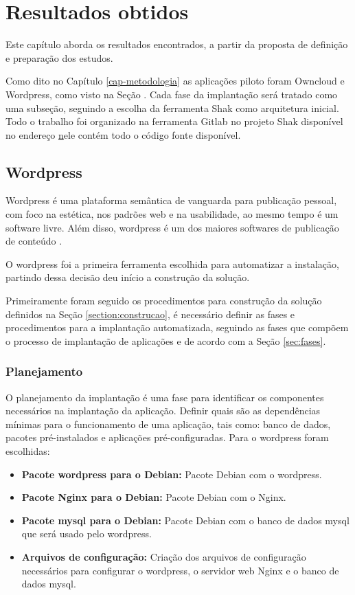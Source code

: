 \chapter{Resultados obtidos}
\label{cap-resultados}

Este capítulo aborda os resultados encontrados, a partir da proposta de
definição e preparação dos estudos. 

Como dito no Capítulo \ref{cap-metodologia}
as aplicações piloto foram Owncloud e Wordpress, como visto na Seção 
\label{subsection:validacao}. Cada fase da implantação será tratado como uma 
subseção, seguindo a escolha da ferramenta Shak como arquitetura inicial. Todo 
o trabalho foi organizado na ferramenta Gitlab no projeto Shak disponível no endereço 
\href{https://gitlab.com/Shak/Shak/} nele contém todo o código fonte disponível.

\section{Wordpress}
\label{sub:wordpress}

Wordpress é uma plataforma semântica de vanguarda para publicação pessoal, 
com foco na estética, nos padrões web e na usabilidade, ao mesmo tempo é 
um software livre. Além disso, wordpress é um dos maiores softwares de 
publicação de conteúdo \cite{wordpress}. 

O wordpress foi a primeira ferramenta escolhida para automatizar a instalação, partindo
dessa decisão deu início a construção da solução.

Primeiramente foram seguido os procedimentos para construção da solução definidos 
na Seção \ref{section:construcao}, é
necessário definir as fases e procedimentos para a implantação automatizada,
seguindo as fases que compõem o processo de implantação de aplicações e de acordo
com a Seção \ref{sec:fases}.

\subsection{Planejamento}

O planejamento da implantação é uma fase para identificar os componentes
necessários na implantação da aplicação. Definir quais são as dependências mínimas
para o funcionamento de uma aplicação, tais como: banco de dados, pacotes
pré-instalados e aplicações pré-configuradas. Para o wordpress foram escolhidas:

\begin{itemize}
   \item \textbf{Pacote wordpress para o Debian:} Pacote Debian com o wordpress.
   \item \textbf{Pacote Nginx para o Debian:} Pacote Debian com o Nginx.
   \item \textbf{Pacote mysql para o Debian:} Pacote Debian com o banco de dados mysql
   que será usado pelo wordpress.
   \item \textbf{Arquivos de configuração:} Criação dos arquivos de configuração
   necessários para configurar o wordpress, o servidor web Nginx e o banco de dados
   mysql.
\end{itemize}

